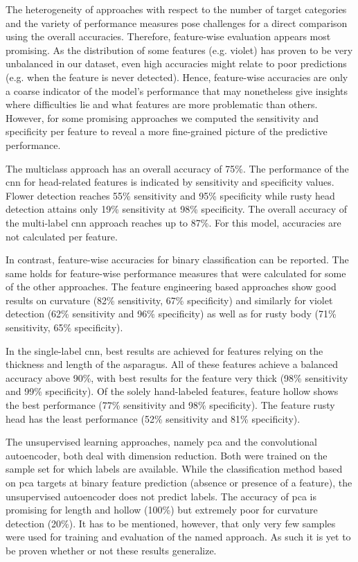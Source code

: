 The heterogeneity of approaches with respect to the number of target categories and the variety of performance measures pose challenges for a direct comparison using the overall accuracies. Therefore, feature-wise evaluation appears most promising. As the distribution of some features (e.g. violet) has proven to be very unbalanced in our dataset, even high accuracies might relate to poor predictions (e.g. when the feature is never detected). Hence, feature-wise accuracies are only a coarse indicator of the model’s performance that may nonetheless give insights where difficulties lie and what features are more problematic than others. However, for some promising approaches we computed the sensitivity and specificity per feature to reveal a more fine-grained picture of the predictive performance.

\bigskip
The multiclass approach has an overall accuracy of 75\%. The performance of the  \acrshort{cnn} for head-related features is indicated by sensitivity and specificity values. Flower detection reaches 55\% sensitivity and 95\% specificity while rusty head detection attains only 19\% sensitivity at 98\% specificity. The overall accuracy of the multi-label \acrshort{cnn} approach reaches up to 87\%. For this model, accuracies are not calculated per feature.

In contrast, feature-wise accuracies for binary classification can be reported. The same holds for feature-wise performance measures that were calculated for some of the other approaches. The feature engineering based approaches show good results on curvature (82\% sensitivity, 67\% specificity) and similarly for violet detection (62\% sensitivity and 96\% specificity) as well as for rusty body (71\% sensitivity, 65\% specificity).

In the single-label \acrshort{cnn}, best results are achieved for features relying on the thickness and length of the asparagus. All of these features achieve a balanced accuracy above 90\%, with best results for the feature very thick (98\% sensitivity and 99\% specificity). Of the solely hand-labeled features, feature hollow shows the best performance (77\% sensitivity and 98\% specificity). The feature rusty head has the least performance (52\% sensitivity and 81\% specificity).

\bigskip
The unsupervised learning approaches, namely \acrshort{pca} and the convolutional autoencoder, both deal with dimension reduction. Both were trained on the sample set for which labels are available. While the classification method based on \acrshort{pca} targets at binary feature prediction (absence or presence of a feature), the unsupervised autoencoder does not predict labels. The accuracy of \acrshort{pca} is promising for length and hollow (100\%) but extremely poor for curvature detection (20\%). It has to be mentioned, however, that only very few samples were used for training and evaluation of the named approach. As such it is yet to be proven whether or not these results generalize.

